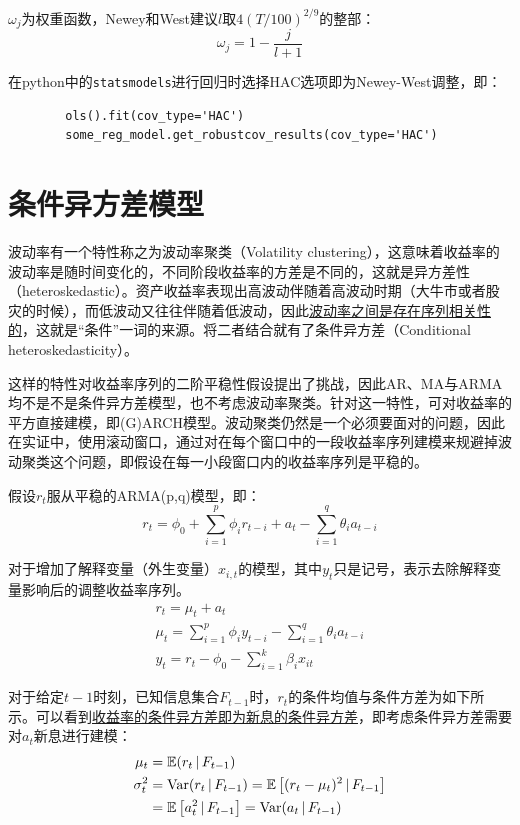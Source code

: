 \documentclass[11pt]{article}
\begin{document}
$\omega_j$为权重函数，Newey和West建议$l$取$4(T/100)^{2/9}$的整部：
\begin{equation*}
    \omega_j = 1 - \frac{j}{l+1}
\end{equation*}

\begin{remark}
    在python中的\verb|statsmodels|进行回归时选择HAC选项即为Newey-West调整，即：
    \begin{verbatim}
        ols().fit(cov_type='HAC')
        some_reg_model.get_robustcov_results(cov_type='HAC')
    \end{verbatim}
\end{remark}

\section{条件异方差模型}

波动率有一个特性称之为波动率聚类（Volatility clustering），这意味着收益率的波动率是随时间变化的，不同阶段收益率的方差是不同的，这就是异方差性（heteroskedastic）。资产收益率表现出高波动伴随着高波动时期（大牛市或者股灾的时候），而低波动又往往伴随着低波动，因此\uline{波动率之间是存在序列相关性的}，这就是“条件”一词的来源。将二者结合就有了条件异方差（Conditional heteroskedasticity）。

这样的特性对收益率序列的二阶平稳性假设提出了挑战，因此AR、MA与ARMA均不是不是条件异方差模型，也不考虑波动率聚类。针对这一特性，可对收益率的平方直接建模，即(G)ARCH模型。波动聚类仍然是一个必须要面对的问题，因此在实证中，使用滚动窗口，通过对在每个窗口中的一段收益率序列建模来规避掉波动聚类这个问题，即假设在每一小段窗口内的收益率序列是平稳的。

假设$r_t$服从平稳的ARMA(p,q)模型，即：
\begin{equation*}
    r_t = \phi_0 + \sum_{i=1}^{p} \phi_i r_{t-i} + a_t - \sum_{i=1}^{q} \theta_i a_{t-i}
\end{equation*}

对于增加了解释变量（外生变量）$x_{i,t}$的模型，其中$y_t$只是记号，表示去除解释变量影响后的调整收益率序列。
\begin{gather*}
    r_t=\mu_t + a_t \\
    \mu_t = \sum_{i=1}^{p} \phi_i y_{t-i} - \sum_{i=1}^{q} \theta_i a_{t-i} \\
    y_t = r_t - \phi_0 - \sum_{i=1}^{k} \beta_i x_{it}
\end{gather*}

对于给定$t-1$时刻，已知信息集合$F_{t-1}$时，$r_t$的条件均值与条件方差为如下所示。可以看到\uline{收益率的条件异方差即为新息的条件异方差}，即考虑条件异方差需要对$a_t$新息进行建模：
\begin{align*}
    \mu_t &= \mathbb{E}(r_t \,\vert\, F_{t-1}) \\
    \sigma_{t}^{2} &= \operatorname{Var}(r_t \,\vert\, F_{t-1})
    = \mathbb{E} \left[ (r_t - \mu_t)^2 \,\vert\, F_{t-1} \right] \\
    &= \mathbb{E} \left[ a_{t}^{2} \,\vert\, F_{t-1} \right]
    = \operatorname{Var}(a_t \,\vert\, F_{t-1})
\end{align*}
\end{document}
